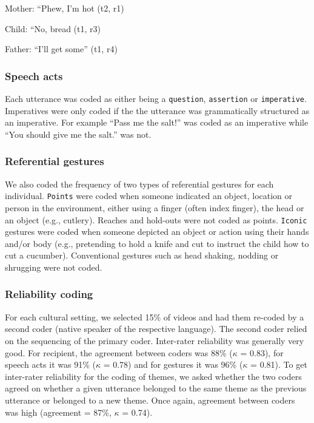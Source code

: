 \documentclass[
  man,floatsintext]{apa6}
\begin{document}
Mother: ``Phew, I'm hot (t2, r1)

Child: ``No, bread (t1, r3)

Father: ``I'll get some'' (t1, r4)

\hypertarget{speech-acts}{%
\subsubsection{Speech acts}\label{speech-acts}}

Each utterance was coded as either being a \texttt{question}, \texttt{assertion} or \texttt{imperative}. Imperatives were only coded if the the utterance was grammatically structured as an imperative. For example ``Pass me the salt!'' was coded as an imperative while ``You should give me the salt.'' was not.

\hypertarget{referential-gestures}{%
\subsubsection{Referential gestures}\label{referential-gestures}}

We also coded the frequency of two types of referential gestures for each individual. \texttt{Points} were coded when someone indicated an object, location or person in the environment, either using a finger (often index finger), the head or an object (e.g., cutlery). Reaches and hold-outs were not coded as points. \texttt{Iconic} gestures were coded when someone depicted an object or action using their hands and/or body (e.g., pretending to hold a knife and cut to instruct the child how to cut a cucumber). Conventional gestures such as head shaking, nodding or shrugging were not coded.

\hypertarget{reliability-coding}{%
\subsubsection{Reliability coding}\label{reliability-coding}}

For each cultural setting, we selected 15\% of videos and had them re-coded by a second coder (native speaker of the respective language). The second coder relied on the sequencing of the primary coder. Inter-rater reliability was generally very good. For recipient, the agreement between coders was 88\% (\(\kappa\) = 0.83), for speech acts it was 91\% (\(\kappa\) = 0.78) and for gestures it was 96\% (\(\kappa\) = 0.81). To get inter-rater reliability for the coding of themes, we asked whether the two coders agreed on whether a given utterance belonged to the same theme as the previous utterance or belonged to a new theme. Once again, agreement between coders was high (agreement = 87\%, \(\kappa\) = 0.74).
\end{document}
